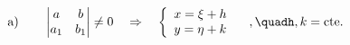 \documentclass[preview]{standalone}
\begin{document}
\begin{align*}
\text{a)}\qquad\begin{vmatrix}a&b\\a_1&b_1\\\end{vmatrix}\neq0\quad\Rightarrow\quad\left\{\begin{array}{l}x=\xi+h\\y=\eta+k\end{array}\right.\quad,\quadh,k=\text{cte.}
\end{align*}
\end{document}
